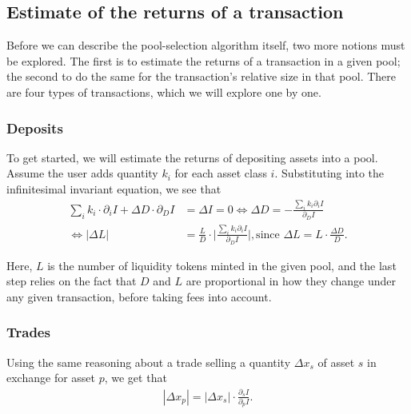 \documentclass[12pt]{article}
\begin{document}
\subsection{Estimate of the returns of a transaction}

Before we can describe the pool-selection algorithm itself, two more notions must
be explored.
The first is to estimate the returns of a transaction in a given pool; the
second to do the same for the transaction's relative size in that pool.
There are four types of transactions, which we will explore one by one.

\subsubsection{Deposits}

To get started, we will estimate the returns of depositing assets into a pool.
Assume the user adds quantity $k_i$ for each asset class $i$. Substituting into
the infinitesimal invariant equation, we see that
\begin{equation*}
  \begin{split}
    \sum_i k_i \cdot \partial_i I + \Delta D \cdot \partial_D I &= \Delta I = 0
    \Leftrightarrow \Delta D = - \frac{\sum_i k_i \partial_i I}{\partial_D I} \\
    \Leftrightarrow |\Delta L| &= \frac{L}{D} \cdot \Big| \frac{\sum_i k_i
    \partial_i I}{\partial_D I} \Big|,
    \text{since } \Delta L = L \cdot \frac{\Delta D}{D}.
  \end{split}
\end{equation*}

Here, $L$ is the number of liquidity tokens minted in the given pool, and the
last step relies on the fact that $D$ and $L$ are proportional in how they
change under any given transaction, before taking fees into account.

\subsubsection{Trades}

Using the same reasoning about a trade selling a quantity $\Delta x_s$ of asset
$s$ in exchange for asset $p$, we get that
\begin{equation*}
  \begin{split}
    |\Delta x_p| = |\Delta x_s| \cdot \frac{\partial_s I}{\partial_p I}.
  \end{split}
\end{equation*}
\end{document}

